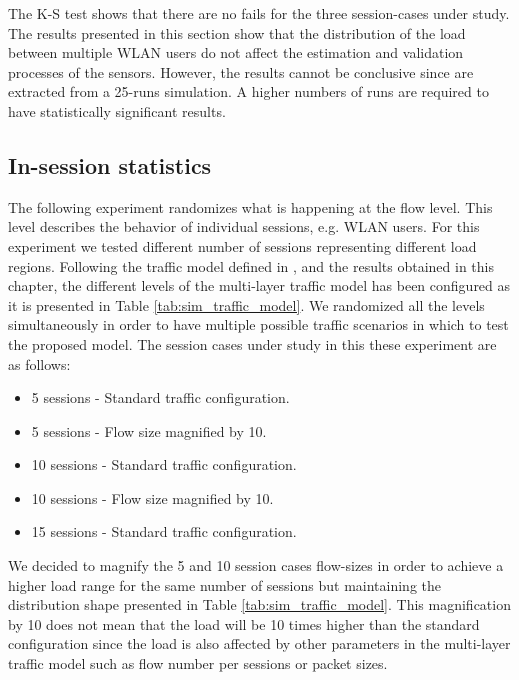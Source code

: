 The \acs{K-S} test shows that there are no fails for the three session-cases under study. The results presented in this section show that the distribution of the load between multiple \acs{WLAN} users do not affect the estimation and validation processes of the sensors. However, the results cannot be conclusive since are extracted from a 25-runs simulation. A higher numbers of runs are required to have statistically significant results.

\subsection{In-session statistics} \label{subsec:globalview_insession}
The following experiment randomizes what is happening at the flow level. This level describes the behavior of individual sessions, e.g. \acs{WLAN} users. For this experiment we tested different number of sessions representing different load regions. Following the traffic model defined in \cite{Campus-WLAN}, and the results obtained in this chapter, the different levels of the multi-layer traffic model has been configured as it is presented in Table \ref{tab:sim_traffic_model}. We randomized all the levels simultaneously in order to have multiple possible traffic scenarios in which to test the proposed model. The session cases under study in this these experiment are as follows:

\begin{itemize}
	\item 5 sessions - Standard traffic configuration.
	\item 5 sessions - Flow size magnified by 10.
	\item 10 sessions - Standard traffic configuration.
	\item 10 sessions - Flow size magnified by 10.
	\item 15 sessions - Standard traffic configuration. 
\end{itemize}

We decided to magnify the 5 and 10 session cases flow-sizes in order to achieve a higher load range for the same number of sessions but maintaining the distribution shape presented in Table \ref{tab:sim_traffic_model}. This magnification by 10 does not mean that the load will be 10 times higher than the standard configuration since the load is also affected by other parameters in the multi-layer traffic model such as flow number per sessions or packet sizes.

